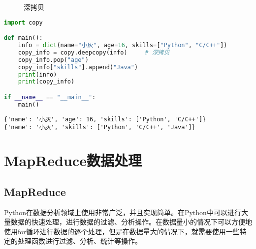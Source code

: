 \begin{figure}[H]
	\centering
	\caption{深拷贝}
\end{figure}

\vspace{0.5cm}


\begin{lstlisting}[language=Python]
import copy

def main():
    info = dict(name="小灰", age=16, skills=["Python", "C/C++"])
    copy_info = copy.deepcopy(info)     # 深拷贝
    copy_info.pop("age")
    copy_info["skills"].append("Java")
    print(info)
    print(copy_info)

if __name__ == "__main__":
    main()
\end{lstlisting}

\begin{tcolorbox}
	\begin{verbatim}
{'name': '小灰', 'age': 16, 'skills': ['Python', 'C/C++']}
{'name': '小灰', 'skills': ['Python', 'C/C++', 'Java']}
\end{verbatim}
\end{tcolorbox}

\newpage

\section{MapReduce数据处理}

\subsection{MapReduce}

Python在数据分析领域上使用非常广泛，并且实现简单。在Python中可以进行大量数据的快速处理，进行数据的过滤、分析操作。在数据量小的情况下可以方便地使用for循环进行数据的逐个处理，但是在数据量大的情况下，就需要使用一些特定的处理函数进行过滤、分析、统计等操作。\\

